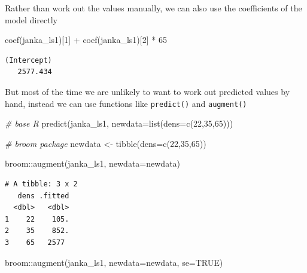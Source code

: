 \documentclass[
]{book}
\newenvironment{Shaded}{\begin{snugshade}}{\end{snugshade}}
\newcommand{\AttributeTok}[1]{\textcolor[rgb]{0.77,0.63,0.00}{#1}}
\newcommand{\CommentTok}[1]{\textcolor[rgb]{0.56,0.35,0.01}{\textit{#1}}}
\newcommand{\ConstantTok}[1]{\textcolor[rgb]{0.00,0.00,0.00}{#1}}
\newcommand{\DecValTok}[1]{\textcolor[rgb]{0.00,0.00,0.81}{#1}}
\newcommand{\FunctionTok}[1]{\textcolor[rgb]{0.00,0.00,0.00}{#1}}
\newcommand{\NormalTok}[1]{#1}
\newcommand{\OtherTok}[1]{\textcolor[rgb]{0.56,0.35,0.01}{#1}}
\newcommand{\SpecialCharTok}[1]{\textcolor[rgb]{0.00,0.00,0.00}{#1}}
\begin{document}
Rather than work out the values manually, we can also use the coefficients of the model directly

\begin{Shaded}
\begin{Highlighting}[]
\FunctionTok{coef}\NormalTok{(janka\_ls1)[}\DecValTok{1}\NormalTok{] }\SpecialCharTok{+} \FunctionTok{coef}\NormalTok{(janka\_ls1)[}\DecValTok{2}\NormalTok{] }\SpecialCharTok{*} \DecValTok{65}
\end{Highlighting}
\end{Shaded}

\begin{verbatim}
(Intercept) 
   2577.434 
\end{verbatim}

But most of the time we are unlikely to want to work out predicted values by hand, instead we can use functions like \texttt{predict()} and \texttt{augment()}

\begin{Shaded}
\begin{Highlighting}[]
\CommentTok{\# base R}
\FunctionTok{predict}\NormalTok{(janka\_ls1, }\AttributeTok{newdata=}\FunctionTok{list}\NormalTok{(}\AttributeTok{dens=}\FunctionTok{c}\NormalTok{(}\DecValTok{22}\NormalTok{,}\DecValTok{35}\NormalTok{,}\DecValTok{65}\NormalTok{)))}
\end{Highlighting}
\end{Shaded}

\begin{Shaded}
\begin{Highlighting}[]
\CommentTok{\# broom package}
\NormalTok{newdata }\OtherTok{\textless{}{-}} \FunctionTok{tibble}\NormalTok{(}\AttributeTok{dens=}\FunctionTok{c}\NormalTok{(}\DecValTok{22}\NormalTok{,}\DecValTok{35}\NormalTok{,}\DecValTok{65}\NormalTok{))}

\NormalTok{broom}\SpecialCharTok{::}\FunctionTok{augment}\NormalTok{(janka\_ls1, }\AttributeTok{newdata=}\NormalTok{newdata)}
\end{Highlighting}
\end{Shaded}

\begin{verbatim}
# A tibble: 3 x 2
   dens .fitted
  <dbl>   <dbl>
1    22    105.
2    35    852.
3    65   2577
\end{verbatim}

\begin{Shaded}
\begin{Highlighting}[]
\NormalTok{broom}\SpecialCharTok{::}\FunctionTok{augment}\NormalTok{(janka\_ls1, }\AttributeTok{newdata=}\NormalTok{newdata, }\AttributeTok{se=}\ConstantTok{TRUE}\NormalTok{)}
\end{Highlighting}
\end{Shaded}
\end{document}

